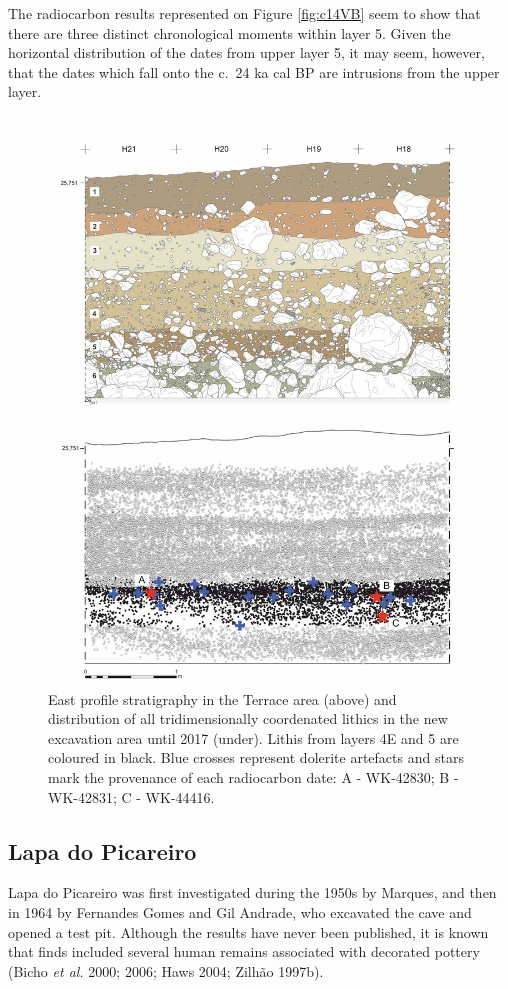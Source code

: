 \documentclass[12pt,twoside]{reedthesis}
\begin{document}
The radiocarbon results represented on Figure \ref{fig:c14VB} seem to show that there are three distinct chronological moments within layer 5. Given the horizontal distribution of the dates from upper layer 5, it may seem, however, that the dates which fall onto the c.~24 ka cal BP are intrusions from the upper layer.
\begin{figure}[H]

{\centering \includegraphics[width=0.7\linewidth]{figure/SpatialanalysisVB} 

}

\caption{East profile stratigraphy in the Terrace area (above) and distribution of all tridimensionally coordenated lithics in the new excavation area until 2017 (under). Lithis from layers 4E and 5 are coloured in black. Blue crosses represent dolerite artefacts and stars mark the provenance of each radiocarbon date: A - WK-42830; B - WK-42831; C - WK-44416.}\label{fig:spatialvbfig}
\end{figure}
\newpage

\hypertarget{lapa-do-picareiro-1}{%
\subsection{Lapa do Picareiro}\label{lapa-do-picareiro-1}}

Lapa do Picareiro was first investigated during the 1950s by Marques, and then in 1964 by Fernandes Gomes and Gil Andrade, who excavated the cave and opened a test pit. Although the results have never been published, it is known that finds included several human remains associated with decorated pottery (Bicho \emph{et al.} 2000; 2006; Haws 2004; Zilhão 1997b).
\end{document}
